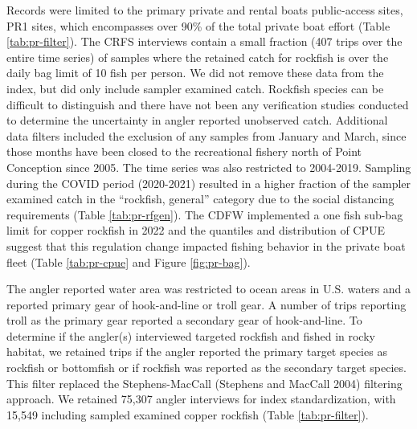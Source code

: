 \documentclass[11pt,
  english,
  letterpaper,
]{article}
\begin{document}
Records were limited to the primary private and rental boats public-access sites, PR1 sites, which encompasses over 90\% of the total private boat effort (Table \ref{tab:pr-filter}). The CRFS interviews contain a small fraction (407 trips over the entire time series) of samples where the retained catch for rockfish is over the daily bag limit of 10 fish per person. We did not remove these data from the index, but did only include sampler examined catch. Rockfish species can be difficult to distinguish and there have not been any verification studies conducted to determine the uncertainty in angler reported unobserved catch. Additional data filters included the exclusion of any samples from January and March, since those months have been closed to the recreational fishery north of Point Conception since 2005. The time series was also restricted to 2004-2019. Sampling during the COVID period (2020-2021) resulted in a higher fraction of the sampler examined catch in the ``rockfish, general'' category due to the social distancing requirements (Table \ref{tab:pr-rfgen}). The CDFW implemented a one fish sub-bag limit for copper rockfish in 2022 and the quantiles and distribution of CPUE suggest that this regulation change impacted fishing behavior in the private boat fleet (Table \ref{tab:pr-cpue} and Figure \ref{fig:pr-bag}).

The angler reported water area was restricted to ocean areas in U.S. waters and a reported primary gear of hook-and-line or troll gear. A number of trips reporting troll as the primary gear reported a secondary gear of hook-and-line. To determine if the angler(s) interviewed targeted rockfish and fished in rocky habitat, we retained trips if the angler reported the primary target species as rockfish or bottomfish or if rockfish was reported as the secondary target species. This filter replaced the Stephens-MacCall (Stephens and MacCall 2004) filtering approach. We retained 75,307 angler interviews for index standardization, with 15,549 including sampled examined copper rockfish (Table \ref{tab:pr-filter}).
\end{document}
